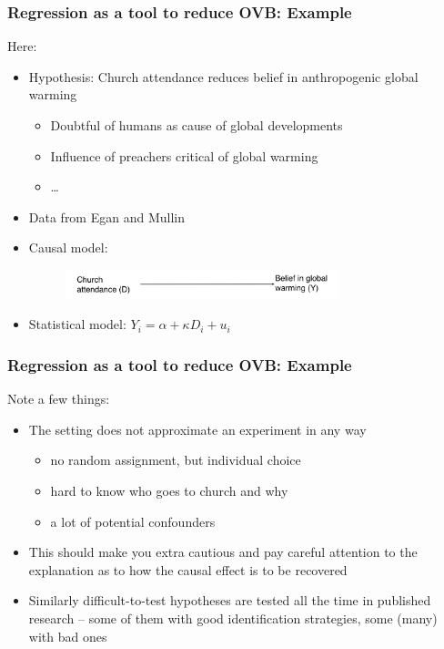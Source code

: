 \documentclass[12pt,english,dvipsnames,aspectratio=169,handout]{beamer}\usepackage[]{graphicx}\usepackage[]{xcolor}
\begin{document}
\begin{frame}
\frametitle{Regression as a tool to reduce OVB: Example}

Here: 
\begin{itemize}
  \item Hypothesis: Church attendance reduces belief in anthropogenic global warming
    \begin{itemize} \footnotesize
      \item Doubtful of humans as cause of global developments
      \item Influence of preachers critical of global warming
      \item \ldots
    \end{itemize} \normalsize
  \item Data from Egan and Mullin \citeyear{egan_turning_2012}
  \item Causal model:
    \begin{figure}
    \includegraphics[width=0.75\textwidth]{../04-figures/03/02-w3_dag1}
    \end{figure}
  \item Statistical model: $Y_i = \alpha + \kappa D_i + u_i$
\end{itemize}

\end{frame}


\begin{frame}
\frametitle{Regression as a tool to reduce OVB: Example}

Note a few things:

\begin{itemize}
  \item The setting does not approximate an experiment in any way 
      \begin{itemize} \footnotesize
      \item no random assignment, but individual choice
      \item hard to know who goes to church and why
      \item a lot of potential confounders 
      \end{itemize} \normalsize
  \item This should make you extra cautious and pay careful attention to the explanation as to how the causal effect is to be recovered
  \item Similarly difficult-to-test hypotheses are tested all the time in published research -- some of them with good identification strategies, some (many) with bad ones
\end{itemize}

\end{frame}
\end{document}
